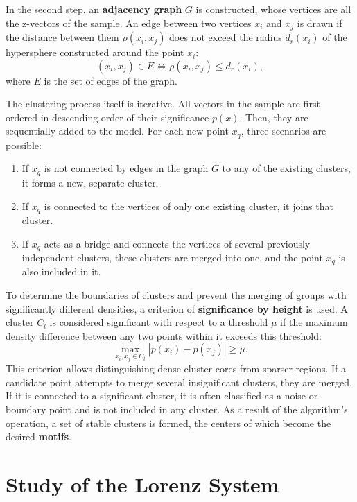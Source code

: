 \documentclass[a4paper,12pt]{extarticle}
\begin{document}
In the second step, an \textbf{adjacency graph} $G$ is constructed, whose vertices are
 all the z-vectors of the sample. An edge between two vertices $x_i$ and $x_j$ is drawn if
  the distance between them $\rho(x_i, x_j)$ does not exceed the radius $d_r(x_i)$
  of the hypersphere constructed around the point $x_i$:
\[
(x_i, x_j) \in E \iff \rho(x_i, x_j) \le d_r(x_i),
\]
where $E$ is the set of edges of the graph.

The clustering process itself is iterative. All vectors in the sample are first
ordered in descending order of their significance $p(x)$. Then, they are sequentially
added to the model. For each new point $x_q$, three scenarios are possible:
\begin{enumerate}
    \item If $x_q$ is not connected by edges in the graph $G$ to any of the existing
    clusters, it forms a new, separate cluster.
    \item If $x_q$ is connected to the vertices of only one existing cluster,
     it joins that cluster.
    \item If $x_q$ acts as a bridge and connects the vertices of several previously
     independent clusters, these clusters are merged into one, and the point $x_q$ is also included in it.
\end{enumerate}

To determine the boundaries of clusters and prevent the merging of groups with significantly different
densities, a criterion of \textbf{significance by height} is used. A cluster
 $C_l$ is considered significant with respect to a threshold $\mu$ if the maximum density difference
  between any two points within it exceeds this threshold:
\begin{equation}
\max_{x_i, x_j \in C_l} |p(x_i) - p(x_j)| \ge \mu.
\end{equation}
This criterion allows distinguishing dense cluster cores from sparser
regions. If a candidate point attempts to merge several insignificant clusters,
 they are merged. If it is connected to a significant cluster, it is often classified
  as a noise or boundary point and is not included in any cluster. As a result
  of the algorithm's operation, a set of stable clusters is formed, the centers of which become the desired \textbf{motifs}.

\section{Study of the Lorenz System}
\end{document}
